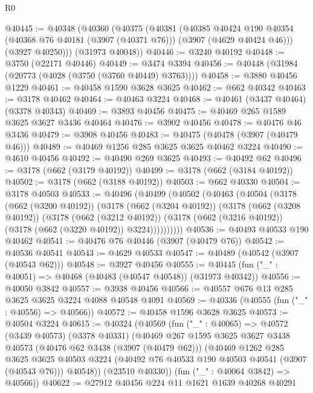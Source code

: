 \begin{lexlean}{R0}
\begin{coremodule}
@40445 := @40348
    (@40360
      (@40375
        (@40381
          (@40385
            @40424
            @190
            @40354
            (@40368 @76 @40181 (@3907 (@40371 @76)))
            (@3907 (@4629 @40424 @46)))
          (@3927 @40250)))
      (@31973 @40048))
@40446 := @3240 @40192
@40448 := @3750 (@22171 @40446)
@40449 := @3474 @3394
@40456 := @40448 (@31984 (@20773 (@4028 (@3750 (@3760 @40449) @3763))))
@40458 := @3880 @40456 @1229
@40461 := @40458 @1590 @3628 @3625
@40462 := @662 @40342
@40463 := @3178 @40462
@40464 := @40463 @3224
@40468 := @40461 (@3437 @40464) (@3378 @40343)
@40469 := @3893 @40456
@40475 := @40469 @265 @1589 @3625 @3627 @3436 @40464
@40476 := @3902 @40456
@40478 := @40476 @46 @3436
@40479 := @3908 @40456
@40483 := @40475 (@40478 (@3907 (@40479 @46)))
@40489 := @40469 @1256 @285 @3625 @3625 @40462 @3224
@40490 := @4610 @40456
@40492 := @40490 @269 @3625
@40493 := @40492 @62
@40496 := @3178 (@662 (@3179 @40192))
@40499 := @3178 (@662 (@3184 @40192))
@40502 := @3178 (@662 (@3188 @40192))
@40503 := @662 @40330
@40504 := @3178 @40503
@40533 := @40496
    (@40499
      (@40502
        (@40463
          (@40504
            (@3178
              (@662 (@3200 @40192))
              (@3178
                (@662 (@3204 @40192))
                (@3178
                  (@662 (@3208 @40192))
                  (@3178
                    (@662 (@3212 @40192))
                    (@3178 (@662 (@3216 @40192)) (@3178 (@662 (@3220 @40192)) @3224))))))))))
@40536 := @40493 @40533 @190 @40462
@40541 := @40476 @76 @40446 (@3907 (@40479 @76))
@40542 := @40536 @40541
@40543 := @4629 @40533
@40547 := @40489 (@40542 (@3907 (@40543 @62)))
@40548 := @3927 @40456
@40555 := @40445 (fun ("_" : @40051) => @40468 (@40483 (@40547 @40548)) (@31973 @40342))
@40556 := @40050 @3842
@40557 := @3938 @40456
@40566 := @40557 @676 @13 @285 @3625 @3625 @3224 @4088 @40548 @4091
@40569 := @40336 (@40555 (fun ("_" : @40556) => @40566))
@40572 := @40458 @1596 @3628 @3625
@40573 := @40504 @3224
@40615 := @40324
    (@40569
      (fun ("_" : @40065) =>
      @40572
        (@3439 @40573)
        (@3378 @40331)
        (@40469
          @267
          @1595
          @3625
          @3627
          @3438
          @40573
          (@40476 @62 @3438 (@3907 (@40479 @62)))
          (@40469
            @1262
            @285
            @3625
            @3625
            @40503
            @3224
            (@40492 @76 @40533 @190 @40503 @40541 (@3907 (@40543 @76)))
            @40548))
        (@23510 @40330))
      (fun ("_" : @40064 @3842) => @40566))
@40622 := @27912 @40456 @224 @11 @1621 @1639 @40268 @40291

\end{coremodule}
\end{lexlean}
